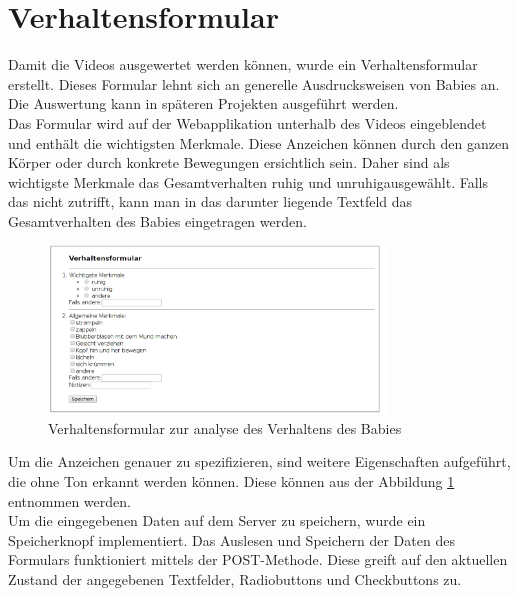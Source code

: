 \section{Verhaltensformular}
\label{sec:verhaltensformular}

Damit die Videos ausgewertet werden können, wurde ein Verhaltensformular erstellt. Dieses Formular lehnt sich an generelle Ausdrucksweisen von Babies an.
Die Auswertung kann in späteren Projekten ausgeführt werden.\\

Das Formular wird auf der Webapplikation unterhalb des Videos eingeblendet und enthält die wichtigsten Merkmale. Diese Anzeichen können durch den ganzen Körper oder durch konkrete Bewegungen ersichtlich sein. Daher sind als \dq wichtigste Merkmale \dq das Gesamtverhalten \dq ruhig \dq und \dq unruhig\dq ausgewählt. Falls das nicht zutrifft, kann man in das darunter liegende Textfeld das Gesamtverhalten des Babies eingetragen werden.

\begin{figure}[]
	\centering
		\includegraphics[width=0.8\textwidth]{includes/evalsys/graphics/verhaltensformular}
	\caption{Verhaltensformular zur analyse des Verhaltens des Babies}
	\label{fig:verhaltensformular}
\end{figure}

Um die Anzeichen genauer zu spezifizieren, sind weitere Eigenschaften aufgeführt, die ohne Ton erkannt werden können. Diese können aus der Abbildung \ref{fig:verhaltensformular} entnommen werden.\\
Um die eingegebenen Daten auf dem Server zu speichern, wurde ein Speicherknopf implementiert. Das Auslesen und Speichern der Daten des Formulars funktioniert mittels der POST-Methode. Diese greift auf den aktuellen Zustand der angegebenen Textfelder, Radiobuttons und Checkbuttons zu.
